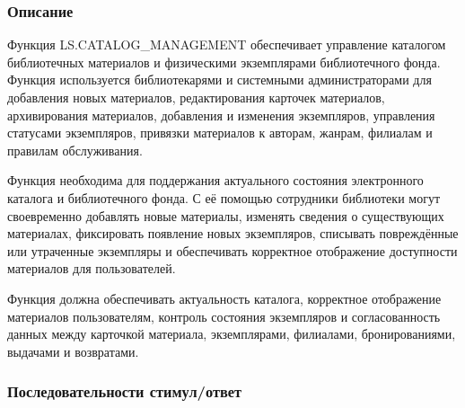 \documentclass[12pt,a4paper]{article}
\begin{document}
	\subsubsection{Описание}
	
	Функция LS.CATALOG\_MANAGEMENT обеспечивает управление каталогом библиотечных
	материалов и физическими экземплярами библиотечного фонда. Функция используется
	библиотекарями и системными администраторами для добавления новых материалов,
	редактирования карточек материалов, архивирования материалов, добавления и изменения
	экземпляров, управления статусами экземпляров, привязки материалов к авторам,
	жанрам, филиалам и правилам обслуживания.
	
	Функция необходима для поддержания актуального состояния электронного каталога
	и библиотечного фонда. С её помощью сотрудники библиотеки могут своевременно
	добавлять новые материалы, изменять сведения о существующих материалах,
	фиксировать появление новых экземпляров, списывать повреждённые или утраченные
	экземпляры и обеспечивать корректное отображение доступности материалов для
	пользователей.
	
	Функция должна обеспечивать актуальность каталога, корректное отображение
	материалов пользователям, контроль состояния экземпляров и согласованность данных
	между карточкой материала, экземплярами, филиалами, бронированиями, выдачами
	и возвратами.
	
	\subsubsection{Последовательности стимул/ответ}
	
\end{document}
